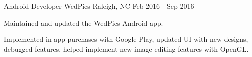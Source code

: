 \begin{cventries}
  \cventry
    {Android Developer} %
    {WedPics} %
    {Raleigh, NC} %
    {Feb 2016 - Sep 2016} %
    {
      \begin{cvitems} %
        \item {Maintained and updated the WedPics Android app.}
        \item {Implemented in-app-purchases with Google Play, updated UI with new designs, debugged features, helped implement new image editing features with OpenGL.}
      \end{cvitems}
    }

\end{cventries}
